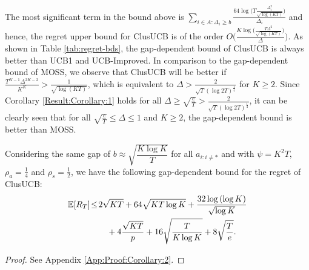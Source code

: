 The most significant term in the bound above is $\sum_{i\in A:\Delta_{i}\geq b}\frac{64\log{\big(T\frac{\Delta_{i}^{2}}{\sqrt{\log (KT)}}\big)}}{\Delta_{i}}$ and hence, the regret upper bound for ClusUCB is of the order $O\bigg(\frac{K\log \big(\frac{T\Delta^{2}}{\sqrt{\log (KT)}}\big)}{\Delta}\bigg)$. As shown in Table \ref{tab:regret-bds}, the gap-dependent bound of ClusUCB is always better than UCB1 and UCB-Improved. 
%
In comparison to the gap-dependent bound of MOSS, we observe that ClusUCB will be better if 
$\frac{T^{K-1}\Delta^{2K-2}}{K^{K}} > \frac{1}{\sqrt{\log(KT)}}$, which is equivalent to $\Delta > \frac{2}{\sqrt{T}(\log 2T)^{\frac{1}{4}}}$ for
$K\geq 2$. Since Corollary \ref{Result:Corollary:1} holds for all $\Delta \geq \sqrt{\frac{e}{T}} > \frac{2}{\sqrt{T}(\log 2T)^{\frac{1}{4}}}$, it can be clearly seen that for all $\sqrt{\frac{e}{T}} \leq \Delta\leq 1$ and $K\geq 2$, the gap-dependent bound is better than MOSS.

\begin{corollary}
\label{Result:Corollary:2}
Considering the same gap of $b\approx \sqrt{\dfrac{K\log K}{T}}$ for all $a_{i:i\neq *}$ and with $\psi=K^{2}T$, $\rho_{a}=\frac{1}{4}$ and $\rho_{s}=\frac{1}{2}$, 
 we have the following gap-dependent bound for the regret of ClusUCB:
\begin{align*}
\mathbb{E} [R_T] &\!\le\! 2\sqrt{KT} + 64\sqrt{KT\log K} + \dfrac{32\log{(\log K)}}{\sqrt{\log K}} \\
&\qquad+ 4\dfrac{\sqrt{KT}}{p}  + 16\sqrt{\dfrac{T}{K\log K}} + 8\sqrt{\dfrac{T}{e}} .
\end{align*}
\end{corollary}
\begin{proof}
 See Appendix \ref{App:Proof:Corollary:2}.
\end{proof}


